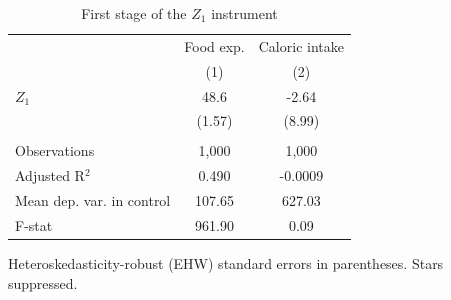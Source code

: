 
\begin{table}[htbp]
   \caption{\label{tab:fs_z1} First stage of the $Z_1$ instrument}
   \bigskip
   \centering
   \begin{tabular}{lcc}
      \toprule
                                & Food exp. & Caloric intake \\   
                                & (1)       & (2)\\  
      \midrule 
      $Z_1$                     & 48.6      & -2.64\\   
                                & (1.57)    & (8.99)\\   
       \\
      Observations              & 1,000     & 1,000\\  
      Adjusted R$^2$            & 0.490     & -0.0009\\  
      Mean dep. var. in control & 107.65    & 627.03\\  
      F-stat                    & 961.90    & 0.09\\  
      \bottomrule
   \end{tabular}
   
   \par \raggedright 
   Heteroskedasticity-robust (EHW) standard errors in parentheses. Stars suppressed.
\end{table}


